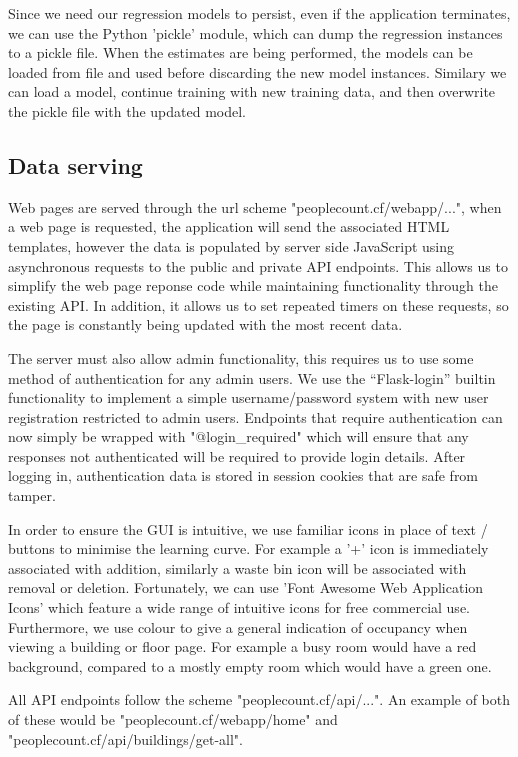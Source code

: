 \documentclass{l4proj}
\begin{document}
Since we need our regression models to persist, even if the application terminates, we can use the Python 'pickle' module, which can dump the regression instances to a pickle file. When the estimates are being performed, the models can be loaded from file and used before discarding the new model instances. Similary we can load a model, continue training with new training data, and then overwrite the pickle file with the updated model.


\subsection{Data serving}
Web pages are served through the url scheme "peoplecount.cf/webapp/...", when a web page is requested, the application will send the associated HTML templates, however the data is populated by server side JavaScript using asynchronous requests to the public and private API endpoints. This allows us to simplify the web page reponse code while maintaining functionality through the existing API. In addition, it allows us to set repeated timers on these requests, so the page is constantly being updated with the most recent data.

The server must also allow admin functionality, this requires us to use some method of authentication for any admin users. We use the “Flask-login” builtin functionality to implement a simple username/password system with new user registration restricted to admin users. Endpoints that require authentication can now simply be wrapped with "@login\_required" which will ensure that any responses not authenticated will be required to provide login details. After logging in, authentication data is stored in session cookies that are safe from tamper.

In order to ensure the GUI is intuitive, we use familiar icons in place of text / buttons to minimise the learning curve. For example a '+' icon is immediately associated with addition, similarly a waste bin icon will be associated with removal or deletion. Fortunately, we can use 'Font Awesome Web Application Icons' which feature a wide range of intuitive icons for free commercial use. Furthermore, we use colour to give a general indication of occupancy when viewing a building or floor page. For example a busy room would have a red background, compared to a mostly empty room which would have a green one.

All API endpoints follow the scheme "peoplecount.cf/api/...". An example of both of these would be "peoplecount.cf/webapp/home" and "peoplecount.cf/api/buildings/get-all".
\end{document}
